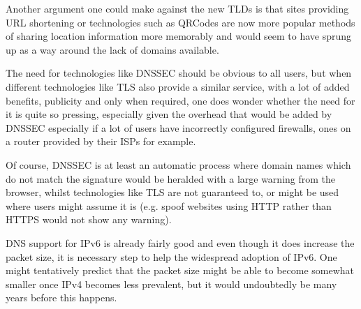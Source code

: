 \documentclass[11pt, a4paper]{article}
\begin{document}
Another argument one could make against the new \glspl{TLD} is that sites 
providing \gls{URL} shortening or technologies such as \glspl{QRCode} are now
more popular methods of sharing location information more memorably and would
seem to have sprung up as a way around the lack of domains available.

The need for technologies like \gls{DNSSEC} should be obvious to all users, but
when different technologies like \gls{TLS} also provide a similar service, with
a lot of added benefits, publicity and only when required, one does wonder 
whether the need for it is quite so pressing, especially given the overhead that
would be added by \gls{DNSSEC} especially if a lot of users have incorrectly
configured firewalls, ones on a router provided by their \glspl{ISP} for 
example.

Of course, \gls{DNSSEC} is at least an automatic process where domain names 
which do not match the signature would be heralded with a large warning from
the browser, whilst technologies like \gls{TLS} are not guaranteed to, or might
be used where users might assume it is (e.g. spoof websites using HTTP rather 
than HTTPS would not show any warning).

\gls{DNS} support for IPv6 is already fairly good and even though it does 
increase the packet size, it is necessary step to help the widespread
adoption of IPv6. One might tentatively predict that the packet size might be
able to become somewhat smaller once IPv4 becomes less prevalent, but it would
undoubtedly be many years before this happens.

\newpage


\end{document}

